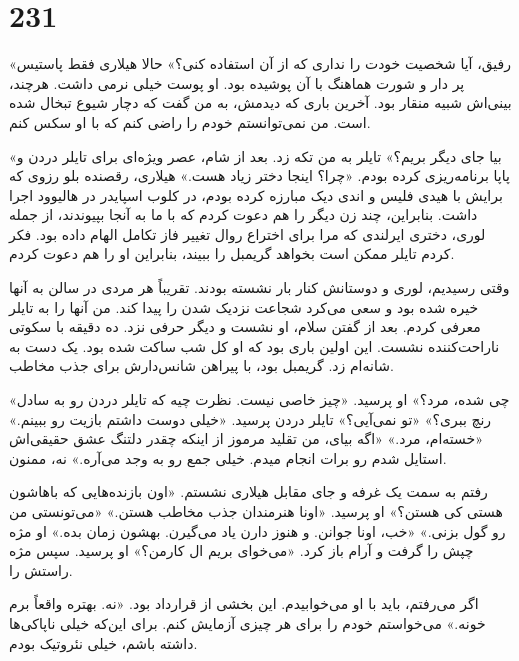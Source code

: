 

\section*{231}
«رفیق، آیا شخصیت خودت را نداری که از آن استفاده کنی؟»
حالا هیلاری فقط پاستیس پر دار و شورت هماهنگ با آن پوشیده بود. او پوست خیلی نرمی داشت. هرچند، بینی‌اش شبیه منقار بود. آخرین باری که دیدمش، به من گفت که دچار شیوع تبخال شده است. من نمی‌توانستم خودم را راضی کنم که با او سکس کنم.

«بیا جای دیگر بریم؟» تایلر به من تکه زد.
بعد از شام، عصر ویژه‌ای برای تایلر دردن و پاپا برنامه‌ریزی کرده بودم.
«چرا؟ اینجا دختر زیاد هست.»
هیلاری، رقصنده بلو رزوی که برایش با هیدی فلیس و اندی دیک مبارزه کرده بودم، در کلوب اسپایدر در هالیوود اجرا داشت. بنابراین، چند زن دیگر را هم دعوت کردم که با ما به آنجا بپیوندند، از جمله لوری، دختری ایرلندی که مرا برای اختراع روال تغییر فاز تکامل الهام داده بود. فکر کردم تایلر ممکن است بخواهد گریمبل را ببیند، بنابراین او را هم دعوت کردم.

وقتی رسیدیم، لوری و دوستانش کنار بار نشسته بودند. تقریباً هر مردی در سالن به آنها خیره شده بود و سعی می‌کرد شجاعت نزدیک شدن را پیدا کند. من آنها را به تایلر معرفی کردم. بعد از گفتن سلام، او نشست و دیگر حرفی نزد. ده دقیقه با سکوتی ناراحت‌کننده نشست. این اولین باری بود که او کل شب ساکت شده بود.
یک دست به شانه‌ام زد. گریمبل بود، با پیراهن شانس‌دارش برای جذب مخاطب.

«چی شده، مرد؟» او پرسید.
«چیز خاصی نیست. نظرت چیه که تایلر دردن رو به سادل رنچ ببری؟»
«تو نمی‌آیی؟» تایلر دردن پرسید. «خیلی دوست داشتم بازیت رو ببینم.»
«خسته‌ام، مرد.»
«اگه بیای، من تقلید مرموز از اینکه چقدر دلتنگ عشق حقیقی‌اش استایل شدم رو برات انجام میدم. خیلی جمع رو به وجد می‌آره.»
نه، ممنون.

رفتم به سمت یک غرفه و جای مقابل هیلاری نشستم.
«اون بازنده‌هایی که باهاشون هستی کی هستن؟» او پرسید.
«اونا هنرمندان جذب مخاطب هستن.»
«می‌تونستی من رو گول بزنی.»
«خب، اونا جوانن. و هنوز دارن یاد می‌گیرن. بهشون زمان بده.»
او مژه چپش را گرفت و آرام باز کرد. «می‌خوای بریم ال کارمن؟» او پرسید. سپس مژه راستش را.

اگر می‌رفتم، باید با او می‌خوابیدم. این بخشی از قرارداد بود. «نه. بهتره واقعاً برم خونه.»
می‌خواستم خودم را برای هر چیزی آزمایش کنم. برای این‌که خیلی ناپاکی‌ها داشته باشم، خیلی نئروتیک بودم.

